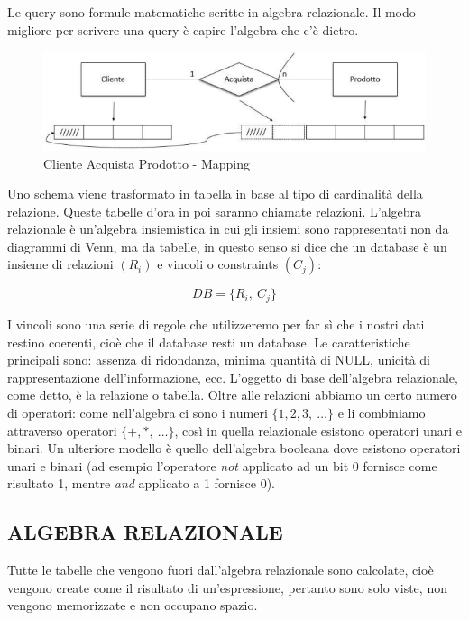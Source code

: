 Le query sono formule matematiche scritte in algebra relazionale. Il modo migliore per scrivere  una query è capire l'algebra che c'è dietro. 

\begin{center}
\begin{figure}[H]
\centering
\includegraphics[scale=0.8]{figures/cap_logical.png}
\caption{Cliente Acquista Prodotto - Mapping} 
\end{figure}
\end{center}

Uno schema viene trasformato in tabella in base al tipo di cardinalità della relazione. Queste tabelle d'ora in poi saranno chiamate relazioni. L'algebra relazionale è un'algebra insiemistica in cui  gli insiemi sono rappresentati non da diagrammi di Venn, ma da tabelle, in questo senso si dice  che un database è un insieme di relazioni $(R_i)$ e vincoli o constraints $(C_j)$:

\[
	DB = \{R_i,\ C_j\}
\]

I vincoli sono una serie di regole che utilizzeremo per far sì che i nostri dati restino coerenti,  cioè che il database resti un database. Le caratteristiche principali sono: assenza di ridondanza, minima quantità di NULL, unicità di rappresentazione dell'informazione, ecc.  
L'oggetto di base dell'algebra relazionale, come detto, è la relazione o tabella. Oltre alle relazioni abbiamo un certo numero di operatori: come nell'algebra ci sono i numeri $\{1,2,3,\ \dots\}$ e li combiniamo attraverso operatori $\{+,*,\ \dots\}$, così in quella relazionale esistono operatori unari e binari. Un ulteriore modello è quello dell'algebra booleana dove  esistono operatori unari e binari (ad esempio l'operatore \textit{not} applicato ad un bit 0 fornisce  come risultato 1, mentre \textit{and} applicato a 1 fornisce 0).  


\subsection{ALGEBRA RELAZIONALE}

Tutte le tabelle che vengono fuori dall'algebra relazionale sono calcolate, cioè vengono  create come il risultato di un'espressione, pertanto sono solo viste, non vengono memorizzate  e non occupano spazio. 

